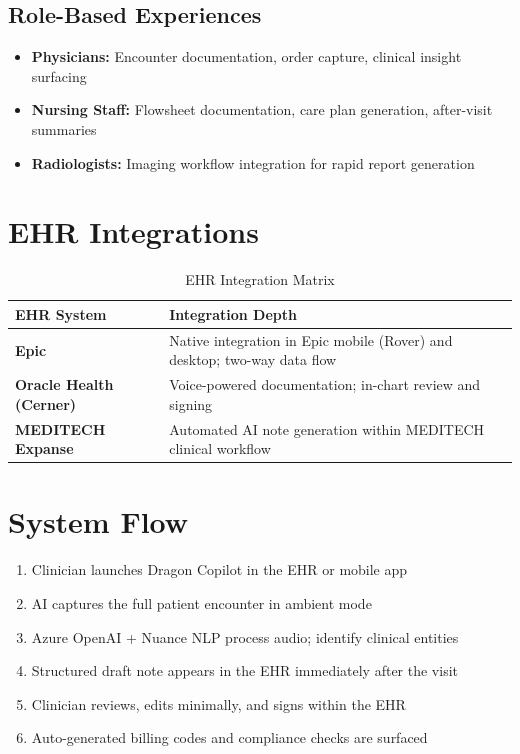 \documentclass[12pt,a4paper]{article}
\begin{document}
\subsection{Role-Based Experiences}
\begin{itemize}[noitemsep]
    \item \textbf{Physicians:} Encounter documentation, order capture, clinical insight surfacing
    \item \textbf{Nursing Staff:} Flowsheet documentation, care plan generation, after-visit summaries
    \item \textbf{Radiologists:} Imaging workflow integration for rapid report generation
\end{itemize}

\section{EHR Integrations}

\begin{table}[H]\centering\renewcommand{\arraystretch}{1.4}
\begin{tabularx}{\textwidth}{lX}\toprule
\textbf{EHR System} & \textbf{Integration Depth}\\\midrule
\textbf{Epic}              & Native integration in Epic mobile (Rover) and desktop; two-way data flow \\
\textbf{Oracle Health (Cerner)} & Voice-powered documentation; in-chart review and signing \\
\textbf{MEDITECH Expanse}  & Automated AI note generation within MEDITECH clinical workflow \\
\bottomrule\end{tabularx}\caption{EHR Integration Matrix}\end{table}

\section{System Flow}
\begin{enumerate}
    \item Clinician launches Dragon Copilot in the EHR or mobile app
    \item AI captures the full patient encounter in ambient mode
    \item Azure OpenAI + Nuance NLP process audio; identify clinical entities
    \item Structured draft note appears in the EHR immediately after the visit
    \item Clinician reviews, edits minimally, and signs within the EHR
    \item Auto-generated billing codes and compliance checks are surfaced
\end{enumerate}
\end{document}
